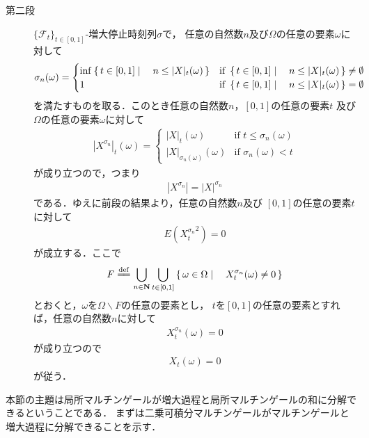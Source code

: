 \begin{sketch}
\begin{description}
			\item[第二段] $\{\mathscr{F}_{t}\}_{t \in [0,1]}$-増大停止時刻列$\sigma$で，
				任意の自然数$n$及び$\Omega$の任意の要素$\omega$に対して
				\begin{align}
					\sigma_{n}(\omega) = 
					\begin{cases}
						\operatorname*{inf}_{} \left\{\, t \in [0,1] \mid \quad n \leq |X|_{t}(\omega)\, \right\} 
						& \mbox{if } \left\{\, t \in [0,1] \mid \quad n \leq |X|_{t}(\omega)\, \right\} \neq \emptyset \\
						1 & \mbox{if } \left\{\, t \in [0,1] \mid \quad n \leq |X|_{t}(\omega)\, \right\} = \emptyset
					\end{cases}
				\end{align}
				を満たすものを取る．このとき任意の自然数$n$，$[0,1]$の任意の要素$t$
				及び$\Omega$の任意の要素$\omega$に対して
				\begin{align}
					\left|X^{\sigma_{n}}\right|_{t}(\omega) = 
					\begin{cases}
						\left|X\right|_{t}(\omega) &\mbox{if } t \leq \sigma_{n}(\omega) \\
						\left|X\right|_{\sigma_{n}(\omega)}(\omega) &\mbox{if } \sigma_{n}(\omega) < t
					\end{cases}
				\end{align}
				が成り立つので，つまり
				\begin{align}
					\left|X^{\sigma_{n}}\right| = |X|^{\sigma_{n}}
				\end{align}
				である．ゆえに前段の結果より，任意の自然数$n$及び
				$[0,1]$の任意の要素$t$に対して
				\begin{align}
					E\left({X^{\sigma_{n}}_{t}}^{2}\right) = 0
				\end{align}
				が成立する．ここで
				\begin{align}
					F \defeq \bigcup_{n \in \Natural} \bigcup_{t \in [0,1]}
					\Set{\omega \in \Omega}{X^{\sigma_{n}}_{t}(\omega) \neq 0}
				\end{align}
				とおくと，$\omega$を$\Omega \backslash F$の任意の要素とし，
				$t$を$[0,1]$の任意の要素とすれば，任意の自然数$n$に対して
				\begin{align}
					X^{\sigma_{n}}_{t}(\omega) = 0
				\end{align}
				が成り立つので
				\begin{align}
					X_{t}(\omega) = 0
				\end{align}
				が従う．
				\QED
		\end{description}
	\end{sketch}
	
	本節の主題は局所マルチンゲールが増大過程と局所マルチンゲールの和に分解できるということである．
	まずは二乗可積分マルチンゲールがマルチンゲールと増大過程に分解できることを示す．
	
